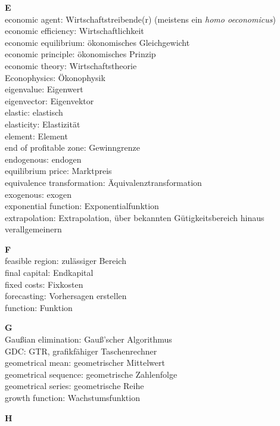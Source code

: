 \medskip
\noindent
{\bf E}\\
economic agent: Wirtschaftstreibende(r) (meistens ein \emph{homo 
oeconomicus})\\
economic efficiency: Wirtschaftlichkeit\\
economic equilibrium: \"okonomisches Gleichgewicht\\
economic principle: \"okonomisches Prinzip\\
economic theory: Wirtschaftstheorie\\
Econophysics: \"{O}konophysik\\
eigenvalue: Eigenwert\\
eigenvector: Eigenvektor\\
elastic: elastisch\\
elasticity: Elastizit\"at\\
element: Element\\
end of profitable zone: Gewinngrenze\\
endogenous: endogen\\
equilibrium price: Marktpreis\\
equivalence transformation: \"{A}quivalenztransformation\\
exogenous: exogen\\
exponential function: Exponentialfunktion\\
extrapolation: Extrapolation, \"uber bekannten G\"utigkeitsbereich 
hinaus verallgemeinern

\medskip
\noindent
{\bf F}\\
feasible region: zul\"{a}ssiger Bereich\\
final capital: Endkapital\\
fixed costs: Fixkosten\\
forecasting: Vorhersagen erstellen\\
function: Funktion

\medskip
\noindent
{\bf G}\\
Gau\ss ian elimination: Gau\ss'scher Algorithmus\\
GDC: GTR, grafikf\"ahiger Taschenrechner\\
geometrical mean: geometrischer Mittelwert\\
geometrical sequence: geometrische Zahlenfolge\\
geometrical series: geometrische Reihe\\
growth function: Wachstumsfunktion

\medskip
\noindent
{\bf H}\\

